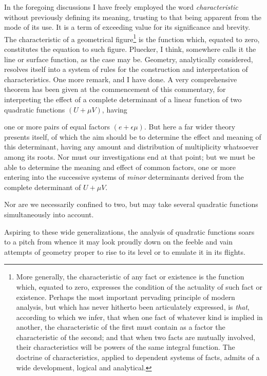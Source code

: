 \documentclass[11pt]{article}
\newcommand{\sourcepage}[1]{\marginpar{\scriptsize p.~#1}}
\begin{document}
In the foregoing discussions I have freely employed the word \emph{characteristic} without previously defining its meaning, trusting to that being apparent from the mode of its use. It is a term of exceeding value for its significance and brevity. The characteristic of a geometrical figure\footnote{More generally, the characteristic of any fact or existence is the function which, equated to zero, expresses the condition of the actuality of such fact or existence. Perhaps the most important pervading principle of modern analysis, but which has never hitherto been articulately expressed, is \emph{that}, according to which we infer, that when one fact of whatever kind is implied in another, the characteristic of the first must contain as a factor the characteristic of the second; and that when two facts are mutually involved, their characteristics will be powers of the same integral function. The doctrine of characteristics, applied to dependent systems of facts, admits of a wide development, logical and analytical.} is the function which, equated to zero, constitutes the equation to such figure. Pluecker, I think, somewhere calls it the line or surface function, as the case may be. Geometry, analytically considered, resolves itself into a system of rules for the construction and interpretation of characteristics. One more remark, and I have done. A very comprehensive theorem has been given at the commencement of this commentary, for interpreting the effect of a complete determinant of a linear function of two quadratic functions $(U+\mu V)$, having

\sourcepage{150}
one or more pairs of equal factors $(e+\epsilon\mu)$. But here a far wider theory presents itself, of which the aim should be to determine the effect and meaning of this determinant, having any amount and distribution of multiplicity whatsoever among its roots. Nor must our investigations end at that point; but we must be able to determine the meaning and effect of common factors, one or more entering into the successive systems of \emph{minor} determinants derived from the complete determinant of $U+\mu V$.

Nor are we necessarily confined to two, but may take several quadratic functions simultaneously into account.

Aspiring to these wide generalizations, the analysis of quadratic functions soars to a pitch from whence it may look proudly down on the feeble and vain attempts of geometry proper to rise to its level or to emulate it in its flights.
\end{document}
